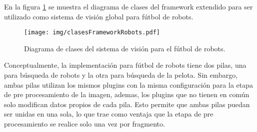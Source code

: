 En la figura \ref{clasesFrameworkRobots} se muestra el diagrama de clases del
framework extendido para ser utilizado como sistema de visión global para
fútbol de robots.

\begin{figure}[h]

	\texttt{[image: img/clasesFrameworkRobots.pdf]}

	\caption{Diagrama de clases del sistema de visión para el fútbol
	de robots.}

	\label{clasesFrameworkRobots}

\end{figure}

Conceptualmente, la implementación para fútbol de robots tiene dos pilas, una
para búsqueda de robots y la otra para búsqueda de la pelota. Sin embargo, ambas
pilas utilizan los mismos plugins con la misma configuración para la etapa de
pre procesamiento de la imagen, ademas, los plugins que no tienen en común solo
modifican datos propios de cada pila. Esto permite que ambas pilas puedan ser
unidas en una sola, lo que trae como ventaja que la etapa de pre procesamiento
se realice solo una vez por fragmento.
